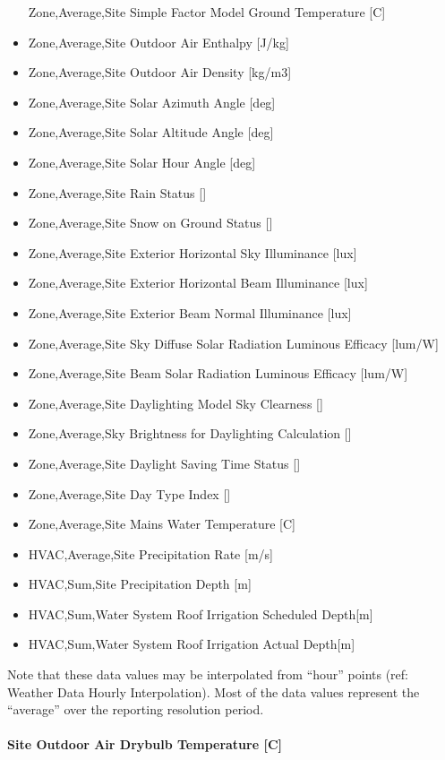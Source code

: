 \begin{itemize}
  Zone,Average,Site Simple Factor Model Ground Temperature {[}C{]}
\item
  Zone,Average,Site Outdoor Air Enthalpy {[}J/kg{]}
\item
  Zone,Average,Site Outdoor Air Density {[}kg/m3{]}
\item
  Zone,Average,Site Solar Azimuth Angle {[}deg{]}
\item
  Zone,Average,Site Solar Altitude Angle {[}deg{]}
\item
  Zone,Average,Site Solar Hour Angle {[}deg{]}
\item
  Zone,Average,Site Rain Status {[]}
\item
  Zone,Average,Site Snow on Ground Status {[]}
\item
  Zone,Average,Site Exterior Horizontal Sky Illuminance {[}lux{]}
\item
  Zone,Average,Site Exterior Horizontal Beam Illuminance {[}lux{]}
\item
  Zone,Average,Site Exterior Beam Normal Illuminance {[}lux{]}
\item
  Zone,Average,Site Sky Diffuse Solar Radiation Luminous Efficacy {[}lum/W{]}
\item
  Zone,Average,Site Beam Solar Radiation Luminous Efficacy {[}lum/W{]}
\item
  Zone,Average,Site Daylighting Model Sky Clearness {[]}
\item
  Zone,Average,Sky Brightness for Daylighting Calculation {[]}
\item
  Zone,Average,Site Daylight Saving Time Status {[]}
\item
  Zone,Average,Site Day Type Index {[]}
\item
  Zone,Average,Site Mains Water Temperature {[}C{]}
\item
  HVAC,Average,Site Precipitation Rate {[}m/s{]}
\item
  HVAC,Sum,Site Precipitation Depth {[}m{]}
\item
  HVAC,Sum,Water System Roof Irrigation Scheduled Depth{[}m{]}
\item
  HVAC,Sum,Water System Roof Irrigation Actual Depth{[}m{]}
\end{itemize}

Note that these data values may be interpolated from ``hour'' points (ref: Weather Data Hourly Interpolation). Most of the data values represent the ``average'' over the reporting resolution period.

\paragraph{Site Outdoor Air Drybulb Temperature {[}C{]}}\label{site-outdoor-air-drybulb-temperature-c}

